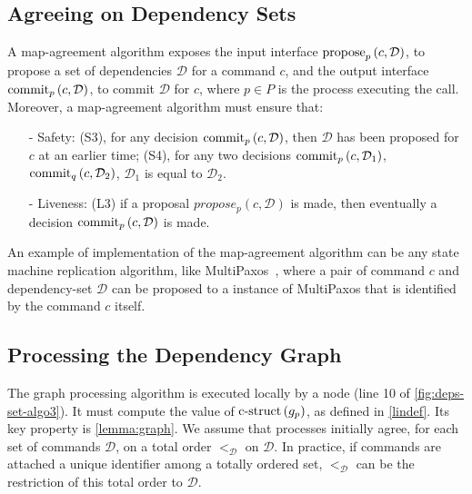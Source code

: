 
\subsection{Agreeing on Dependency Sets}\label{map-algo}
A map-agreement algorithm exposes the input interface $\operatorname{propose}_p\left( c, \mathcal{D} \right)$, to propose a set of dependencies $\mathcal{D}$ for a command $c$, and the output interface $\operatorname{commit}_p\left( c, \mathcal{D} \right)$, to commit $\mathcal{D}$ for $c$, where $p\in P$ is the process executing the call.
Moreover, a map-agreement algorithm must ensure that: 

\begin{enumerate}
    \item[-] Safety: (S3), for any decision $\operatorname{commit}_p\left( c, \mathcal{D} \right)$, then $\mathcal{D}$ has been proposed for $c$ at an earlier time; (S4), for any two decisions $\operatorname{commit}_p\left( c, \mathcal{D}_1 \right)$, $\operatorname{commit}_q\left( c, \mathcal{D}_2 \right)$, $\mathcal{D}_1$ is equal to $\mathcal{D}_2$.  
    \item[-] Liveness: (L3) if a proposal $propose_p\left( c,\mathcal{D} \right)$ is made, then eventually a decision $\operatorname{commit}_p\left( c, \mathcal{D} \right)$ is made.
\end{enumerate}

An example of implementation of the map-agreement algorithm can be any state machine replication algorithm, like MultiPaxos~\cite{lamport2001paxos}, where a pair of command $c$ and dependency-set $\mathcal{D}$ can be proposed to a instance of MultiPaxos that is identified by the command $c$ itself.

\subsection{Processing the Dependency Graph}
\label{abstract-algo}

The graph processing algorithm is executed locally by a node (line 10 of \cref{fig:deps-set-algo3}). It must compute the value of $\operatorname{c-struct}\left( g_p \right)$, as defined in \cref{lindef}.
Its key property is \cref{lemma:graph}. 
We assume that processes initially agree, for each set of commands $\mathcal{D}$, on a total order $<_{\mathcal{D}}$ on $\mathcal{D}$.
In practice, if commands are attached a unique identifier among a totally ordered set, $<_{\mathcal{D}}$ can be the restriction of this total order to $\mathcal{D}$.

